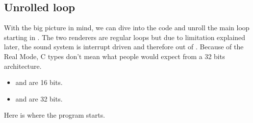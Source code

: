 \documentclass[book.tex]{subfiles}
\begin{document}
 









\subsection{Unrolled loop}
With the big picture in mind, we can dive into the code and unroll the main loop starting in . The two renderers are regular loops but due to limitation explained later, the sound system is interrupt driven and therefore out of . Because of the Real Mode, C types don't mean what people would expect from a 32 bits architecture.\\
\begin{itemize}
\item {} and  are 16 bits.
\item {} and  are 32 bits.
\end{itemize}
\par
Here is where the program starts.\\
\par
\begin{minipage}{\textwidth}

\end{minipage}
\par
\end{document}

